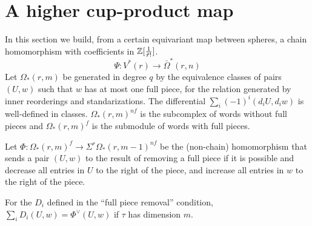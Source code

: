 
\section{A higher cup-product map}

In this section we build, from a certain equivariant map between spheres, a chain homomorphism with coefficients in $\mathbb{Z}[\frac{1}{\tilde{r}!}]$.
\[\Psi\colon V^*(r)\to \bar{\Omega}^*(r,n)\]
Let $\Omega_*(r,m)$ be generated in degree $q$ by the equivalence classes of pairs $(U,w)$ such that $w$ has at most one full piece, for the relation generated by inner reorderings and standarizations. The differential $\sum_{i} (-1)^i(d_iU,d_iw)$ is well-defined in classes. $\Omega_*(r,m)^{nf}$ is the subcomplex of words without full pieces and $\Omega_*(r,m)^{f}$ is the submodule of words with full pieces.

Let $\Phi\colon \Omega_*(r,m)^f\to \Sigma^{r}\Omega_{*}(r,m-1)^{nf}$ be the (non-chain) homomorphism that sends a pair $(U,w)$ to the result of removing a full piece if it is possible and decrease all entries in $U$ to the right of the piece, and increase all entries in $w$ to the right of the piece.

\begin{remark}
	For the $D_i$ defined in the ``full piece removal'' condition, $\sum_iD_i(U,w) = \Phi^{\vee}(U,w)$ if $\tau$ has dimension $m$.
\end{remark}


